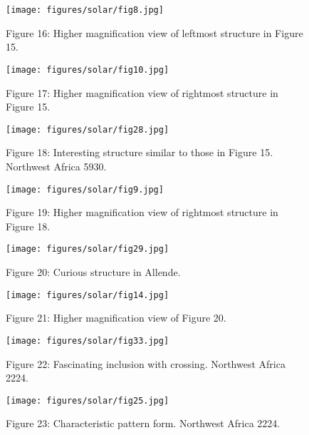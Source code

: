\documentclass[a4paper, 12pt, oneside]{article}
\begin{document}
\begin{figure}[b]
\texttt{[image: figures/solar/fig8.jpg]}
\caption{Figure 16: Higher magnification view of leftmost structure in Figure 15.}
\centering
\end{figure}

\begin{figure}[b]
\texttt{[image: figures/solar/fig10.jpg]}
\caption{Figure 17: Higher magnification view of rightmost structure in Figure 15.}
\centering
\end{figure}
\clearpage

\begin{figure}[b]
\texttt{[image: figures/solar/fig28.jpg]}
\caption{Figure 18: Interesting structure similar to those in Figure 15. Northwest Africa 5930.}
\centering
\end{figure}
\clearpage

\begin{figure}[b]
\centering
\texttt{[image: figures/solar/fig9.jpg]}
\caption{Figure 19: Higher magnification view of rightmost structure in Figure 18.}
\end{figure}
\clearpage

\begin{figure}[b]
\centering
\texttt{[image: figures/solar/fig29.jpg]}
\caption{Figure 20: Curious structure in Allende.}
\end{figure}
\clearpage

\begin{figure}[b]
\texttt{[image: figures/solar/fig14.jpg]}
\caption{Figure 21: Higher magnification view of Figure 20.}
\centering
\end{figure}
\clearpage

\begin{figure}[b]
\texttt{[image: figures/solar/fig33.jpg]}
\caption{Figure 22: Fascinating inclusion with crossing. Northwest Africa 2224.}
\centering
\end{figure}
\clearpage

\begin{figure}[b]
\centering
\texttt{[image: figures/solar/fig25.jpg]}
\caption{Figure 23: Characteristic pattern form. Northwest Africa 2224.}
\end{figure}
\clearpage
\end{document}
